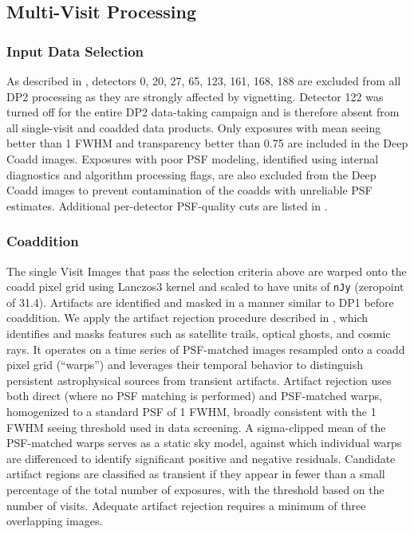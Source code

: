 \subsection{Multi-Visit Processing} \label{sec:drp-multivisit}
\subsubsection{Input Data Selection} \label{sec:drp-multivisit-inputselection}
As described in , detectors 0, 20, 27, 65, 123, 161, 168, 188 are excluded from all \gls{DP2} processing as they are strongly affected by vignetting.
Detector 122 was turned off for the entire \gls{DP2} data-taking campaign and is therefore absent from all single-visit and coadded data products.
Only exposures with mean \gls{seeing} better than 1 \gls{FWHM} and transparency better than 0.75 are included in the Deep Coadd images.
Exposures with poor \gls{PSF} modeling, identified using internal diagnostics and \gls{algorithm} processing flags, are also excluded from the Deep Coadd images to prevent contamination of the coadds with unreliable \gls{PSF} estimates.
Additional per-detector \gls{PSF}-quality cuts are listed in .

\subsubsection{Coaddition} \label{sec:drp-multivisit-coaddition}
The single \glspl{Visit Image} that pass the selection criteria above are warped onto the coadd pixel grid using Lanczos3 kernel and scaled to have units of \texttt{nJy} (zeropoint of 31.4).
Artifacts are identified and masked in a manner similar to \gls{DP1} before coaddition.
We apply the artifact rejection procedure described in \cite[][]{DMTN-080}, which identifies and masks features such as satellite trails, optical ghosts, and cosmic rays.
It operates on a time series of \gls{PSF}-matched images resampled onto a coadd pixel grid (``warps'') and leverages their temporal behavior to distinguish persistent astrophysical sources from \gls{transient} artifacts.
Artifact rejection uses both direct (where no \gls{PSF} matching is performed) and \gls{PSF}-matched warps, homogenized to a standard \gls{PSF} of 1 \gls{FWHM}, broadly consistent with the 1 \gls{FWHM} seeing threshold used in data screening.
A sigma-clipped mean of the \gls{PSF}-matched warps serves as a static sky model, against which individual warps are differenced to identify significant positive and negative residuals.
Candidate artifact regions are classified as \gls{transient} if they appear in fewer than a small percentage of the total number of exposures, with the threshold based on the number of visits.
Adequate artifact rejection requires a minimum of three overlapping images.

